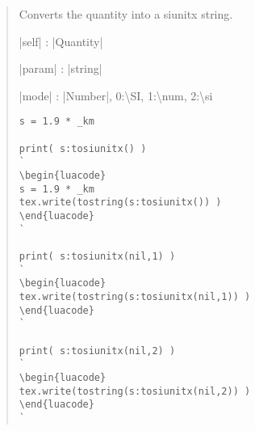 \documentclass{ltxdoc}
\begin{document}
\begin{quote}
  Converts the quantity into a siunitx string.

  \begin{description}
  \item |self| : |Quantity| 
  \item |param| : |string|
  \item |mode| : |Number|, 0:\textbackslash SI, 1:\textbackslash num, 2:\textbackslash si
  \end{description}

\begin{lstlisting}
s = 1.9 * _km

print( s:tosiunitx() )
`
\begin{luacode}
s = 1.9 * _km
tex.write(tostring(s:tosiunitx()) )
\end{luacode}
`

print( s:tosiunitx(nil,1) )
`
\begin{luacode}
tex.write(tostring(s:tosiunitx(nil,1)) )
\end{luacode}
`

print( s:tosiunitx(nil,2) )
`
\begin{luacode}
tex.write(tostring(s:tosiunitx(nil,2)) )
\end{luacode}
`
\end{lstlisting}

\end{quote}
\end{document}
